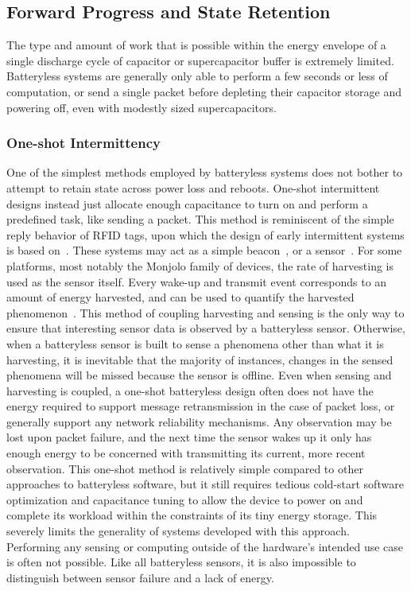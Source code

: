 \subsection{Forward Progress and State Retention}
The type and amount of work that is possible within the energy envelope of a single discharge cycle of capacitor or supercapacitor buffer is extremely limited.
Batteryless systems are generally only able to perform a few seconds or less of computation, or send a single packet before depleting their capacitor storage and powering off, even with modestly sized supercapacitors.

\subsubsection{One-shot Intermittency}
\label{cha:background:one-shot}
One of the simplest methods employed by batteryless systems does not bother to attempt to retain state across power loss and reboots.
One-shot intermittent designs instead just allocate enough capacitance to turn on and perform a predefined task, like sending a packet.
This method is reminiscent of the simple reply behavior of RFID tags, upon which the design of early intermittent systems is based on~\cite{sample2008design}.
These systems may act as a simple beacon~\cite{campbell2016cinamin,saoda2019no}, or a sensor~\cite{yervaGrafting12, debruin2013monjolo, campbellEnergy14, campbellThermes14}.
For some platforms, most notably the Monjolo family of devices, the rate of harvesting is used as the sensor itself. Every wake-up and transmit event corresponds to an amount of energy harvested, and can be used to quantify the harvested phenomenon~\cite{campbellThermes14, campbellEnergy14, debruin2013monjolo}.
This method of coupling harvesting and sensing is the only way to ensure that interesting sensor data is observed by a batteryless sensor.
Otherwise, when a batteryless sensor is built to sense a phenomena other than what it is harvesting, it is inevitable that the majority of instances, changes in the sensed phenomena will be missed because the sensor is offline.
Even when sensing and harvesting is coupled, a one-shot batteryless design often does not have the energy required to support message retransmission in the case of packet loss, or generally support any network reliability mechanisms.
Any observation may be lost upon packet failure, and the next time the sensor wakes up it only has enough energy to be concerned with transmitting its current, more recent observation.
This one-shot method is relatively simple compared to other approaches to batteryless software, but it still requires tedious cold-start software optimization and capacitance tuning to allow the device to power on and complete its workload within the constraints of its tiny energy storage.
This severely limits the generality of systems developed with this approach.
Performing any sensing or computing outside of the hardware's intended use case is often not possible.
Like all batteryless sensors, it is also impossible to distinguish between sensor failure and a lack of energy.

